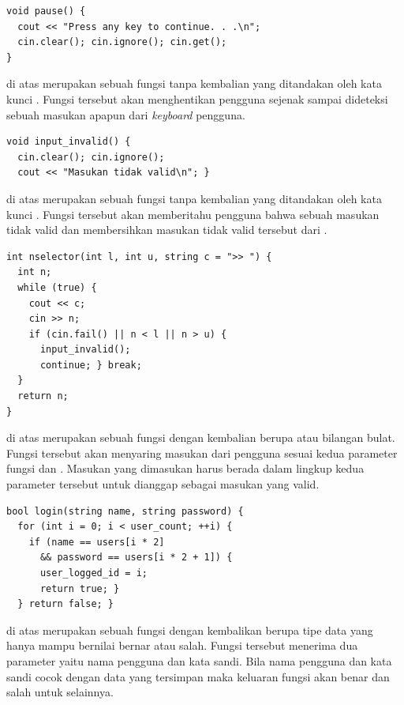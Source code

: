 \documentclass[../main.tex]{subfiles}
\begin{document}
\begin{code}
\begin{verbatim}
void pause() {
  cout << "Press any key to continue. . .\n";
  cin.clear(); cin.ignore(); cin.get();
}
\end{verbatim}
\end{code}

{\Script} di atas merupakan sebuah fungsi tanpa kembalian yang ditandakan oleh kata kunci . Fungsi tersebut akan menghentikan pengguna sejenak sampai dideteksi sebuah masukan apapun dari \textit{keyboard} pengguna.

\begin{code}
\begin{verbatim}
void input_invalid() {
  cin.clear(); cin.ignore();
  cout << "Masukan tidak valid\n"; }
\end{verbatim}
\end{code}

{\Script} di atas merupakan sebuah fungsi tanpa kembalian yang ditandakan oleh kata kunci . Fungsi tersebut akan memberitahu pengguna bahwa sebuah masukan tidak valid dan membersihkan masukan tidak valid tersebut dari {\ioi} {\stream}.

\begin{code}
\begin{verbatim}
int nselector(int l, int u, string c = ">> ") {
  int n;
  while (true) {
    cout << c;
    cin >> n;
    if (cin.fail() || n < l || n > u) {
      input_invalid();
      continue; } break;
  }
  return n;
}
\end{verbatim}
\end{code}

{\Script} di atas merupakan sebuah fungsi dengan kembalian berupa  atau bilangan bulat. Fungsi tersebut akan menyaring masukan dari pengguna sesuai kedua parameter fungsi  dan . Masukan yang dimasukan harus berada dalam lingkup kedua parameter tersebut untuk dianggap sebagai masukan yang valid.

\begin{code}
\begin{verbatim}
bool login(string name, string password) {
  for (int i = 0; i < user_count; ++i) {
    if (name == users[i * 2]
      && password == users[i * 2 + 1]) {
      user_logged_id = i;
      return true; }
  } return false; }
\end{verbatim}
\end{code}

{\Script} di atas merupakan sebuah fungsi dengan kembalikan berupa tipe data  yang hanya mampu bernilai bernar atau salah. Fungsi tersebut menerima dua parameter yaitu nama pengguna dan kata sandi. Bila nama pengguna dan kata sandi cocok dengan data yang tersimpan maka keluaran fungsi akan benar dan salah untuk selainnya.
\end{document}
